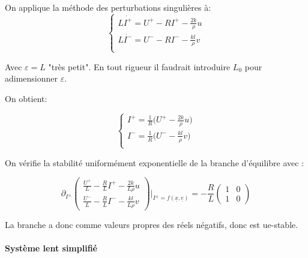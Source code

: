 \documentclass{report}
\begin{document}
On applique la méthode des perturbations singulières à:
\begin{equation*}
    \begin{cases}
        L\dot{I^{+}} = U^{+} - RI^{+} - \frac{2k}{\rho}u \\
        L\dot{I^{-}} = U^{-} - RI^{-} - \frac{kl}{\rho}v \\
    \end{cases}
\end{equation*}

Avec $\varepsilon = L$ "très petit". En tout rigueur il faudrait introduire
$L_0$ pour adimensionner $\varepsilon$.

On obtient:

\begin{equation*}
    \begin{cases}
        I^{+} = \frac{1}{R} \big(U^{+} - \frac{2k}{\rho}u \big) \\
        I^{-} = \frac{1}{R} \big(U^{-} - \frac{kl}{\rho}v \big)\\
    \end{cases}
\end{equation*}

On vérifie la stabilité uniformément exponentielle de la branche d'équilibre avec :

\begin{equation*}
    \partial_{I^{\pm}}
    \begin{pmatrix}
        \frac{U^{+}}{L} - \frac{R}{L}I^{+} - \frac{2k}{L\rho}u  \\
        \frac{U^{-}}{L} - \frac{R}{L}I^{-} - \frac{kl}{L\rho}v  
    \end{pmatrix} \biggr\rvert_{I^{\pm} = f(\underline{x}, \underline{e})}
    = -\frac{R}{L}
    \begin{pmatrix}
        1 & 0 \\
        1 & 0
    \end{pmatrix}
\end{equation*}

La branche a donc comme valeurs propres des réels négatifs, donc est ue-stable.

\paragraph{Système lent simplifié}
\end{document}
